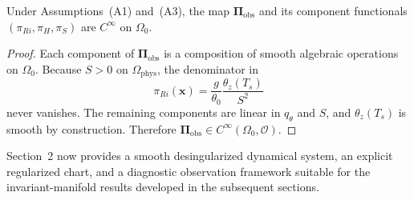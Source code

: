 \begin{proposition}
Under Assumptions~(A1) and~(A3), the map $\boldsymbol{\Pi}_{\mathrm{obs}}$ and its component functionals $(\pi_{Ri}, \pi_H, \pi_S)$ are $C^\infty$ on $\Omega_0$.
\end{proposition}

\begin{proof}
Each component of $\boldsymbol{\Pi}_{\mathrm{obs}}$ is a composition of smooth algebraic operations on $\Omega_0$. Because $S > 0$ on $\Omega_{\mathrm{phys}}$, the denominator in
\begin{equation}
\pi_{Ri}(\mathbf{x}) = \frac{g}{\theta_0}\frac{\theta_z(T_s)}{S^2}
\end{equation}
never vanishes. The remaining components are linear in $q_\theta$ and $S$, and $\theta_z(T_s)$ is smooth by construction. Therefore $\boldsymbol{\Pi}_{\mathrm{obs}} \in C^\infty(\Omega_0, \mathcal O)$.
\end{proof}

Section~2 now provides a smooth desingularized dynamical system, an explicit regularized chart, and a diagnostic observation framework suitable for the invariant-manifold results developed in the subsequent sections.